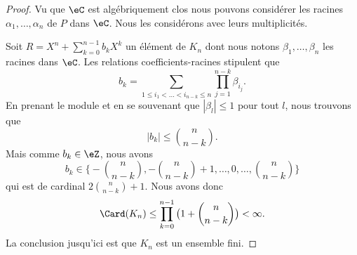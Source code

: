 \begin{proof}
	Vu que \( \eC\) est algébriquement clos
	nous pouvons considérer les racines \( \alpha_1,\ldots, \alpha_n\) de \( P\) dans \( \eC\). Nous les considérons avec leurs multiplicités.

	Soit \( R=X^n+\sum_{k=0}^{n-1}b_kX^k\) un élément de \( K_n\) dont nous notons \( \beta_1,\ldots, \beta_n\) les racines dans \( \eC\). Les relations coefficients-racines stipulent que
	\begin{equation}
		b_k=\sum_{1\leq i_1<\ldots <i_{n-k}\leq n}\prod_{j=1}^{n-k}\beta_{i_j}.
	\end{equation}
	En prenant le module et en se souvenant que \( | \beta_{l} |\leq 1\) pour tout \( l\), nous trouvons que
	\begin{equation}
		| b_k |\leq\binom{ n }{ n-k }.
	\end{equation}
	Mais comme \( b_k\in \eZ\), nous avons
	\begin{equation}
		b_k\in\big\{    -\binom{ n }{ n-k },-\binom{ n }{ n-k }+1,\ldots, 0,\ldots,\binom{ n }{ n-k }   \big\}
	\end{equation}
	qui est de cardinal \( 2\binom{ n }{ n-k }+1\). Nous avons donc
	\begin{equation}
		\Card(K_n)\leq\prod_{k=0}^{n-1}\big( 1+\binom{ n }{ n-k } \big)<\infty.
	\end{equation}
	La conclusion jusqu'ici est que \( K_n\) est un ensemble fini.


\end{proof}

